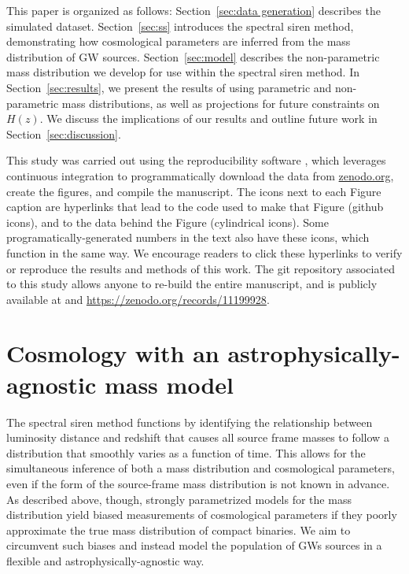 \documentclass[preprint2,linenumbers]{aastex631}
\begin{document}
This paper is organized as follows: Section~\ref{sec:data generation} describes the simulated dataset.
Section~\ref{sec:ss} introduces the spectral siren method, demonstrating how cosmological parameters are inferred from the mass distribution of \ac{GW} sources.
Section~\ref{sec:model} describes the non-parametric mass distribution we develop for use within the spectral siren method.
In Section~\ref{sec:results}, we present the results of using parametric and non-parametric mass distributions, as well as projections for future constraints on $H(z)$.
We discuss the implications of our results and outline future work in Section~\ref{sec:discussion}.


This study was carried out using the reproducibility software \href{https://github.com/showyourwork/showyourwork}{\showyourwork} \citep{Luger2021}, which leverages continuous integration to programmatically download the data from \href{https://zenodo.org/}{zenodo.org}, create the figures, and compile the manuscript.
The icons next to each Figure caption are hyperlinks that lead to the code used to make that Figure (github icons), and to the data behind the Figure (cylindrical icons).
Some programatically-generated numbers in the text also have these icons, which function in the same way.
We encourage readers to click these hyperlinks to verify or reproduce the results and methods of this work.
The git repository associated to this study allows anyone to re-build the entire manuscript, and is publicly available at \GitHubURL{} and \url{https://zenodo.org/records/11199928}.

\section{Cosmology with an astrophysically-agnostic mass model}
\label{sec:methods}

The spectral siren method functions by identifying the relationship between luminosity distance and redshift that causes all source frame masses to follow a distribution that smoothly varies as a function of time. 
This allows for the simultaneous inference of both a mass distribution and cosmological parameters, even if the form of the source-frame mass distribution is not known in advance.
As described above, though, strongly parametrized models for the mass distribution yield biased measurements of cosmological parameters if they poorly approximate the true mass distribution of compact binaries.
We aim to circumvent such biases and instead model the population of \acp{GW} sources in a flexible and astrophysically-agnostic way.
\end{document}
